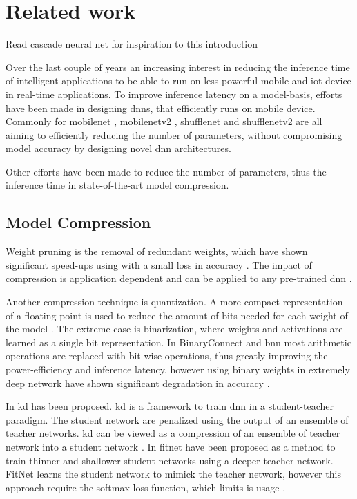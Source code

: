 \section{Related work}

Read cascade neural net for inspiration to this introduction

Over the last couple of years an increasing interest in reducing the inference time of intelligent applications to be able to run on less powerful mobile and \gls{iot} device in real-time applications. To improve inference latency on a model-basis, efforts have been made in designing \gls{dnn}s, that efficiently runs on mobile device. Commonly for \gls{mobilenet} \cite{howard_mobilenets:_2017}, \gls{mobilenetv2} \cite{sandler_mobilenetv2:_2018}, \gls{shufflenet} \cite{zhang_shufflenet:_2017} and \gls{shufflenetv2} \cite{ma_shufflenet_2018} are all aiming to efficiently reducing the number of parameters, without compromising model accuracy by designing novel \gls{dnn} architectures.   

Other efforts have been made to reduce the number of parameters, thus the inference time in state-of-the-art model compression. 

\subsection{Model Compression}

Weight pruning is the removal of redundant weights, which have shown significant speed-ups using with a small loss in accuracy \cite{zhou_edge_2019}. The impact of compression is application dependent and can be applied to any pre-trained \gls{dnn} \cite{cheng_survey_2017}.

Another compression technique is quantization. A more compact representation of a floating point is used to reduce the amount of bits needed for each weight of the model \cite{cheng_survey_2017}. The extreme case is binarization, where weights and activations are learned as a single bit representation. In BinaryConnect \cite{courbariaux_binaryconnect:_2015} and \gls{bnn} \cite{courbariaux_binarized_2016} most arithmetic operations are replaced with bit-wise operations, thus greatly improving the power-efficiency and inference latency, however using binary weights in extremely deep network have shown significant degradation in accuracy \cite{cheng_survey_2017}.

In \cite{hinton_distilling_2015} \gls{kd} has been proposed. \gls{kd} is a framework to train \gls{dnn} in a student-teacher paradigm. The student network are penalized using the output of an ensemble of teacher networks. \gls{kd} can be viewed as a compression of an ensemble of teacher network into a student network \cite{cheng_survey_2017}. 
In \cite{romero_fitnets:_2014} \gls{fitnet} have been proposed as a method to train thinner and shallower student networks using a deeper teacher network. FitNet learns the student network to mimick the teacher network, however this approach require the softmax loss function, which limits is usage \cite{cheng_survey_2017}.  


